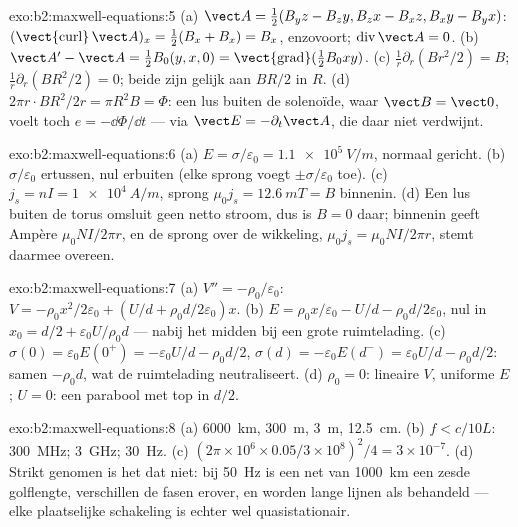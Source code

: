 \begin{solution}{exo:b2:maxwell-equations:5}
(a) $\vect A = \tfrac12(B_yz - B_zy, B_zx - B_xz, B_xy - B_yx)$:
$(\operatorname{\vect{curl}}
\vect A)_x = \tfrac12(B_x + B_x) = B_x$,
enzovoort; $\operatorname{div}\vect A = 0$. (b)
$\vect A' - \vect A = \tfrac12B_0(y, x, 0) = \operatorname{\vect{grad}}(\tfrac12B_0xy)$.
(c) $\frac1r\partial_r(Br^2/2) = B$; $\frac1r\partial_r(BR^2/2) = 0$; beide
zijn gelijk aan $BR/2$ in $R$. (d) $2\pi r\cdot BR^2/2r = \pi R^2B = \Phi$:
een lus buiten de solenoïde, waar $\vect B = \vect 0$, voelt toch
$e = -\dd\Phi/\dd t$ --- via $\vect E =
-\partial_t\vect A$, die daar niet
verdwijnt.
\end{solution}

\begin{solution}{exo:b2:maxwell-equations:6}
(a) $E = \sigma/\varepsilon_0 = \qty{1.1e5}{V/m}$, normaal gericht. (b)
$\sigma/\varepsilon_0$ ertussen, nul erbuiten (elke sprong voegt
$\pm\sigma/\varepsilon_0$ toe). (c) $j_s = nI = \qty{1e4}{A/m}$, sprong
$\mu_0j_s = \qty{12.6}{mT} = B$ binnenin. (d) Een lus buiten de torus
omsluit geen netto stroom, dus is $B = 0$ daar; binnenin geeft Ampère
$\mu_0NI/2\pi r$, en de sprong over de wikkeling,
$\mu_0j_s = \mu_0NI/2\pi r$, stemt daarmee overeen.
\end{solution}

\begin{solution}{exo:b2:maxwell-equations:7}
(a) $V'' = -\rho_0/\varepsilon_0$:
$V = -\rho_0x^2/2\varepsilon_0 + (U/d + \rho_0d/2\varepsilon_0)x$. (b)
$E = \rho_0x/\varepsilon_0 - U/d - \rho_0d/2\varepsilon_0$, nul in
$x_0 = d/2 + \varepsilon_0U/\rho_0d$ --- nabij het midden bij een grote
ruimtelading. (c)
$\sigma(0) = \varepsilon_0E(0^+) =
-\varepsilon_0U/d - \rho_0d/2$,
$\sigma(d) = -\varepsilon_0E(d^-) = \varepsilon_0U/d - \rho_0d/2$: samen
$-\rho_0d$, wat de ruimtelading neutraliseert. (d) $\rho_0 = 0$: lineaire
$V$, uniforme $E$; $U = 0$: een parabool met top in $d/2$.
\end{solution}

\begin{solution}{exo:b2:maxwell-equations:8}
(a) \qty{6000}{km}, \qty{300}{m}, \qty{3}{m}, \qty{12.5}{cm}. (b)
$f < c/10L$: \qty{300}{MHz}; \qty{3}{GHz}; \qty{30}{Hz}. (c)
$(2\pi \times 10^6 \times 0.05/3 \times 10^8)^2/4 =
3 \times 10^{-7}$. (d)
Strikt genomen is het dat niet: bij \qty{50}{Hz} is een net van
\qty{1000}{km} een zesde golflengte, verschillen de fasen erover, en worden
lange lijnen als  behandeld --- elke plaatselijke
schakeling is echter wel quasistationair.
\end{solution}

